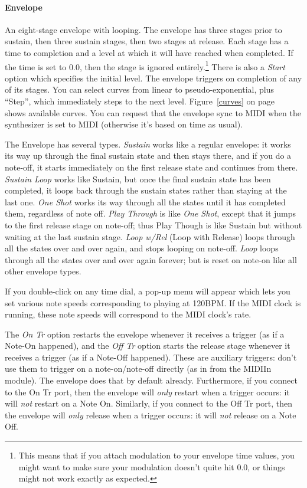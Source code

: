 \documentclass{article}
\begin{document}
\paragraph{Envelope}  An eight-stage envelope with looping.  The envelope has three stages prior to sustain, then three sustain stages, then two stages at release.  Each stage has a time to completion and a level at which it will have reached when completed.  If the time is set to 0.0, then the stage is ignored entirely.\footnote{This means that if you attach modulation to your envelope time values, you might want to make sure your modulation doesn't quite hit 0.0, or things might not work exactly as expected.}  There is also a {\it Start} option which specifies the initial level.  The envelope triggers on completion of any of its stages.  You can select curves from linear to pseudo-exponential, plus ``Step'', which immediately steps to the next level.  Figure~\ref{curves} on page~\pageref{curves} shows available curves.  You can request that the envelope sync to MIDI when the synthesizer is set to MIDI (otherwise it's based on time as usual). 

The Envelope has several types.  {\it Sustain} works like a regular envelope: it works its way up through the final sustain state and then stays there, and if you do a note-off, it starts immediately on the first release state and continues from there.  {\it Sustain Loop} works like Sustain, but once the final sustain state has been completed, it loops back through the sustain states rather than staying at the last one.  {\it One Shot} works its way through all the states until  it has completed them, regardless of note off.  {\it Play Through} is like {\it One Shot}, except that it jumps to the first release stage on note-off; thus Play Though is like Sustain but without waiting at the last sustain stage.  {\it Loop w/Rel} (Loop with Release) loops through all the states over and over again, and stops looping on note-off.  {\it Loop} loops through all the states over and over again forever; but is reset on note-on like all other envelope types.
   
If you double-click on any time dial, a pop-up menu will appear which lets you set various note speeds corresponding to playing at 120BPM.  If the MIDI clock is running, these note speeds will correspond to the MIDI clock's rate.

The {\it On Tr} option restarts the envelope whenever it receives a trigger (as if a Note-On happened), and the {\it Off Tr} option starts the release stage whenever it receives a trigger (as if a Note-Off happened).  These are auxiliary triggers: don't use them to trigger on a note-on/note-off directly (as in from the MIDIIn module).  The envelope does that by default already.  Furthermore, if you connect to the On Tr port, then the envelope will {\it only} restart when a trigger occurs: it will {\it not} restart on a Note On.  Similarly, if you connect to the Off Tr port, then the envelope will {\it only} release when a trigger occurs: it will {\it not} release on a Note Off.   
\end{document}
